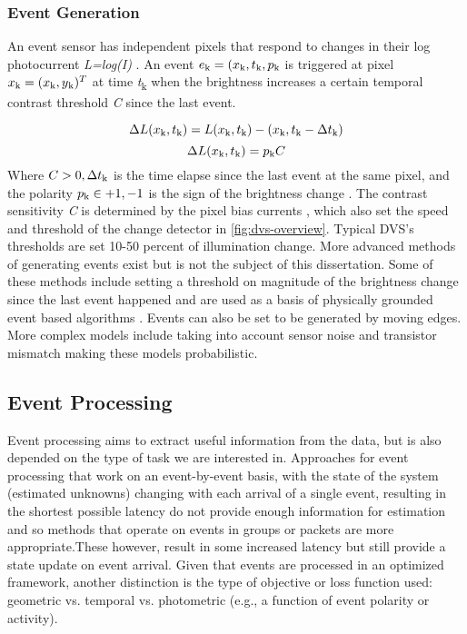 \documentclass[12pt]{report}
\begin{document}
\subsubsection{Event Generation}
An event sensor \cite{Lichtsteiner2008} has independent pixels that respond
to changes in their log photocurrent \textit{L=log(I)} . An event \(e\textsubscript{k}=(x\textsubscript{k},t\textsubscript{k},p\textsubscript{k}\) is triggered at pixel \(x\textsubscript{k}=(x\textsubscript{k},y\textsubscript{k})^T\) at time \textit{t}\textsubscript{k} when the brightness increases a certain temporal contrast threshold \textit{C} since the last event.

\begin{equation}
    \Delta L(x\textsubscript{k},t\textsubscript{k}) = L(x\textsubscript{k},t\textsubscript{k})-(x\textsubscript{k},t\textsubscript{k}-\Delta t\textsubscript{k})
\end{equation}
\begin{equation}
   \Delta L(x\textsubscript{k},t\textsubscript{k}) = p\textsubscript{k}C 
\end{equation}
Where \(C > 0, \Delta t\textsubscript{k}\) is the time elapse since the last event at the same pixel, and the polarity  \(p\textsubscript{k} \in {+1,-1}\) is the sign of the brightness change \cite{Lichtsteiner2008}. The contrast sensitivity \textit{C} is determined by the pixel bias currents \cite{nozaki2017} \cite{Gallego2020}, which also set the speed and threshold of the change detector in \ref{fig:dvs-overview}. Typical DVS's thresholds are set 10-50 percent of illumination change. More advanced methods of generating events exist but is not the subject of this dissertation. Some of these methods include setting a threshold on magnitude of the brightness change since the last event happened and are used as a basis of physically grounded event based algorithms \cite{Gallego2019}. Events can also be set to be generated by moving edges. More complex models include taking into account sensor noise and transistor mismatch making these models probabilistic. 

\subsection{Event Processing}
Event processing aims to extract useful information from the data, but is also depended on the type of task we are interested in. Approaches for event processing that work on an event-by-event basis, with the state of the system (estimated unknowns) changing with each arrival of a single event, resulting in the shortest possible latency do not provide enough information for estimation and so methods that operate on events in groups or packets are more appropriate.These however, result in some increased latency but still provide a state update on event arrival. Given that events are processed in an optimized framework, another distinction is the type of objective or loss function used: geometric vs. temporal vs. photometric (e.g., a function of event polarity or activity).
\end{document}
